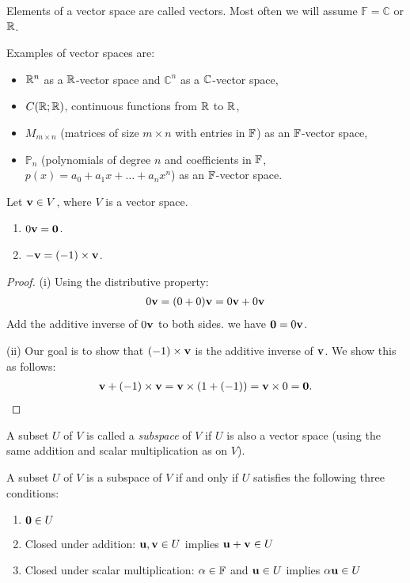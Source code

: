 \documentclass{article}
\begin{document}
Elements of a vector space are called vectors. Most often we will assume $\mathbb{F} = \mathbb{C}$ or ${\mathbb{R}}$.

\begin{example}
Examples of vector spaces are: 
\begin{itemize}
    \item ${\mathbb{R}}^n$ as a ${\mathbb{R}}$-vector space and $\mathbb{C}^n$ as a ${\mathbb{C}}$-vector space,
    \item $C({\mathbb{R}};{\mathbb{R}})$, continuous functions from ${\mathbb{R}}$ to ${\mathbb{R}}$,
    \item $M_{m \times n}$ (matrices of size $m \times n$ with entries in ${\mathbb{F}}$) as an ${\mathbb{F}}$-vector space,
    \item $\mathbb{P}_n$ (polynomials of degree $n$ and coefficients in ${\mathbb{F}}$, $p(x) = a_0 + a_1 x + \ldots + a_n x^n$) as an ${\mathbb{F}}$-vector space.
\end{itemize}  
\end{example}


\begin{proposition}
\label{lem:neg_vec}
Let ${\mathbf{v}} \in V$, where $V$ is a vector space.
\begin{enumerate}
    \item[(i)] $0 {\mathbf{v}}= {\mathbf{0}}$.
    \item[(ii] $-{\mathbf{v}} = (-1) \times {\mathbf{v}}$.
\end{enumerate}
\end{proposition}
\begin{proof}
(i) Using the distributive property:
\begin{align*}
    0 {\mathbf{v}} = (0+0) {\mathbf{v}} = 0 {\mathbf{v}} + 0{\mathbf{v}}
\end{align*}
Add the additive inverse of $0 {\mathbf{v}}$ to both sides. we have ${\mathbf{0}} =  0 {\mathbf{v}}$.

(ii) Our goal is to show that $(-1) \times {\mathbf{v}}$ is the additive inverse of ${\mathbf{v}}$.
We show this as follows:
\begin{align*}
    {\mathbf{v}} + (-1) \times {\mathbf{v}} = {\mathbf{v}} \times (1 + (-1)) = {\mathbf{v}} \times 0 = {\mathbf{0}}.
\end{align*}
\end{proof}

\begin{definition}
A subset $U$ of $V$ is called a \emph{subspace} of $V$ if $U$ is also a vector space (using the same addition and scalar multiplication as on $V$).
\end{definition}


\begin{proposition}\label{prop: characterization of subspace}
A subset $U$ of $V$ is a subspace of $V$ if
and only if $U$ satisfies the following three conditions:
\begin{enumerate}
\item  ${\mathbf{0}} \in U$
\item Closed under addition: ${\mathbf{u}},{\mathbf{v}}\in U$ implies ${\mathbf{u}}+{\mathbf{v}} \in U$
\item Closed under scalar multiplication: $\alpha \in{\mathbb{F}}$ and ${\mathbf{u}}\in U$
implies $\alpha {\mathbf{u}} \in U$
\end{enumerate}
\end{proposition}
\end{document}
